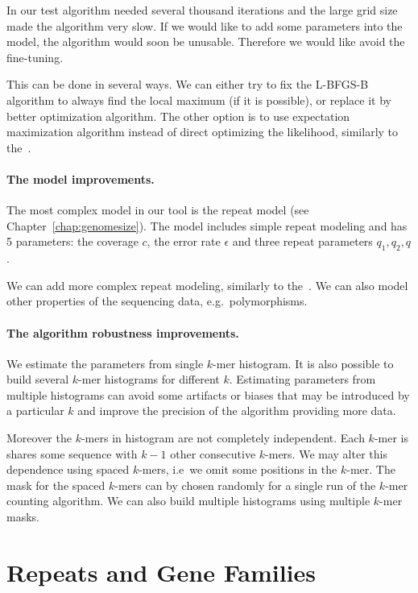 In our test algorithm needed several thousand iterations and the large grid size made the algorithm very slow. If we would like to add some parameters into the model, the algorithm would soon be unusable. Therefore we would like avoid the fine-tuning.

This can be done in several ways. We can either try to fix the L-BFGS-B algorithm to always find the local maximum (if it is possible), or replace it by better optimization algorithm. The other option is to use expectation maximization algorithm instead of direct optimizing the likelihood, similarly to the~\cite{waterman}.

\paragraph{The model improvements.}
The most complex model in our tool is the repeat model (see Chapter~\ref{chap:genomesize}). The model includes simple repeat modeling and has 5 parameters: the coverage $c$, the error rate $\epsilon$ and three repeat parameters $q_1, q_2, q$.

We can add more complex repeat modeling, similarly to the~\cite{williams}. We can also model other properties of the sequencing data, e.g.\ polymorphisms.

\paragraph{The algorithm robustness improvements.}

We estimate the parameters from single $k$-mer histogram. It is also possible to build several $k$-mer histograms for different $k$. Estimating parameters from multiple histograms can avoid some artifacts or biases that may be introduced by a particular $k$ and improve the precision of the algorithm providing more data.

Moreover the $k$-mers in histogram are not completely independent. Each $k$-mer is shares some sequence with $k-1$ other consecutive $k$-mers. We may alter this dependence using spaced $k$-mers, i.e\ we omit some positions in the $k$-mer.
The mask for the spaced $k$-mers can by chosen randomly for a single run of the $k$-mer counting algorithm. We can also build multiple histograms using multiple $k$-mer masks.

\section{Repeats and Gene Families}\label{sect:repeats-families}

